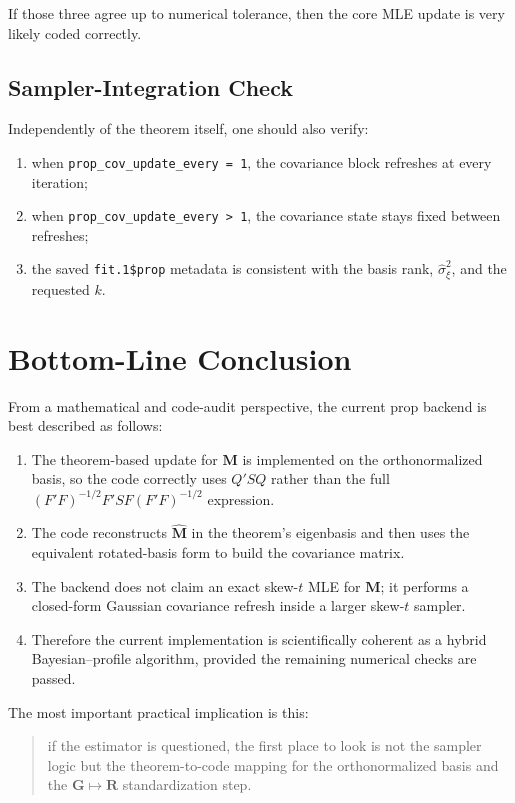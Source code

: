 \documentclass[11pt]{article}
\newcommand{\bR}{\mathbf{R}}
\newcommand{\bG}{\mathbf{G}}
\newcommand{\bM}{\mathbf{M}}
\begin{document}
If those three agree up to numerical tolerance, then the core MLE update is
very likely coded correctly.

\subsection{Sampler-Integration Check}

Independently of the theorem itself, one should also verify:

\begin{enumerate}[label=\arabic*.]
\item when \texttt{prop\_cov\_update\_every = 1}, the covariance block refreshes
at every iteration;
\item when \texttt{prop\_cov\_update\_every > 1}, the covariance state stays
fixed between refreshes;
\item the saved \texttt{fit.1\$prop} metadata is consistent with the basis rank,
\(\widehat{\sigma}_\xi^2\), and the requested \(k\).
\end{enumerate}

\section{Bottom-Line Conclusion}

From a mathematical and code-audit perspective, the current prop backend is
best described as follows:

\begin{enumerate}[label=\arabic*.]
\item The theorem-based update for \(\bM\) is implemented on the
orthonormalized basis, so the code correctly uses \(Q'SQ\) rather than the
full \((F'F)^{-1/2}F'SF(F'F)^{-1/2}\) expression.
\item The code reconstructs \(\widehat{\bM}\) in the theorem's eigenbasis and
then uses the equivalent rotated-basis form to build the covariance matrix.
\item The backend does not claim an exact skew-$t$ MLE for \(\bM\); it performs
a closed-form Gaussian covariance refresh inside a larger skew-$t$ sampler.
\item Therefore the current implementation is scientifically coherent as a
hybrid Bayesian--profile algorithm, provided the remaining numerical checks are
passed.
\end{enumerate}

The most important practical implication is this:

\begin{quote}
if the estimator is questioned, the first place to look is not the sampler
logic but the theorem-to-code mapping for the orthonormalized basis and the
\(\bG \mapsto \bR\) standardization step.
\end{quote}
\end{document}

